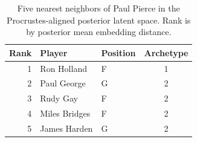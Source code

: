 \begin{table}[htbp]
  \centering\small
  \begin{tabular}{rllc}
    \toprule
    Rank & Player & Position & Archetype \\
    \midrule
    1 & Ron Holland & F & 1 \\
    2 & Paul George & G & 2 \\
    3 & Rudy Gay & F & 2 \\
    4 & Miles Bridges & F & 2 \\
    5 & James Harden & G & 2 \\
    \bottomrule
  \end{tabular}
  \caption{Five nearest neighbors of Paul Pierce in the Procrustes-aligned posterior latent space. Rank is by posterior mean embedding distance.}
  \label{tab:Paul_Pierce_neighbors}
\end{table}

